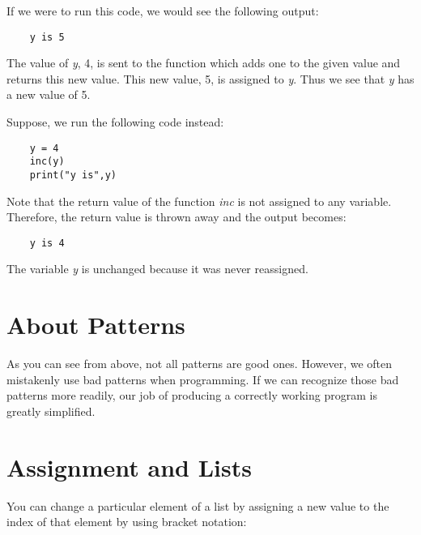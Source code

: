If we were to run this code, we would see the following 
output:

\color{CodeGreen}
\begin{codesize}
\begin{verbatim}
    y is 5
\end{verbatim}
\end{codesize}
\color{black}

The value of {\it y}, 4, is sent to the function which adds one to
the given value and returns this new value. This new value, 5, is
assigned to {\it y}. Thus we see that {\it y} has a new value of 5.

Suppose, we run the following code instead:

\color{CodeGreen}
\begin{codesize}
\begin{verbatim}
    y = 4
    inc(y)
    print("y is",y)
\end{verbatim}
\end{codesize}
\color{black}
    
Note that the
return value of the function {\it inc} is not assigned to any
variable. Therefore, the return value is thrown away and the
output becomes:

\color{CodeGreen}
\begin{codesize}
\begin{verbatim}
    y is 4
\end{verbatim}
\end{codesize}
\color{black}

The variable {\it y} is unchanged because it was never reassigned.

\section{About Patterns}

As you can see from above, not all patterns are good ones. However,
we often mistakenly use bad patterns when programming. If we 
can recognize those bad patterns more readily, our job of producing
a correctly working program is greatly simplified.

\section{Assignment and Lists}

You can change a particular element of a list by
assigning a new value to the index of that element
by using bracket notation:

